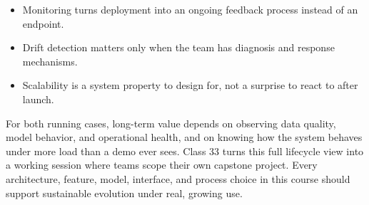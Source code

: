 \classclosingframe
{\begin{itemize}
\item Monitoring turns deployment into an ongoing feedback process instead of an endpoint.
\item Drift detection matters only when the team has diagnosis and response mechanisms.
\item Scalability is a system property to design for, not a surprise to react to after launch.
\end{itemize}}
{For both running cases, long-term value depends on observing data quality, model behavior, and operational health, and on knowing how the system behaves under more load than a demo ever sees.}
{Class 33 turns this full lifecycle view into a working session where teams scope their own capstone project.}
{Every architecture, feature, model, interface, and process choice in this course should support sustainable evolution under real, growing use.}


